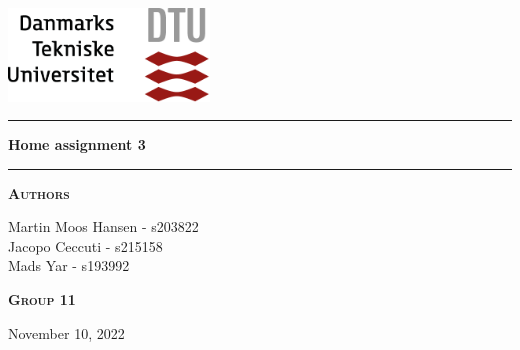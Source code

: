 
\begin{titlepage}
\begin{center}
\vspace{2cm}
\includegraphics[width=0.4\textwidth]{root/dtu.png}~\\[1cm]
\vspace{2cm}

\vspace{2cm}

\hrule
\vspace{.5cm}
{ \huge \bfseries Home assignment 3 } %
\vspace{.5cm}

\hrule
\vspace{1.5cm}

\textsc{\textbf{Authors}}\\
\vspace{.5cm}
\centering

Martin Moos Hansen - s203822\\
Jacopo Ceccuti - s215158\\
Mads Yar - s193992\\

\vspace{2cm}

\textsc{\textbf{Group 11}}\\

\vspace{2cm}

\centering November 10, 2022%
\end{center}
\end{titlepage}